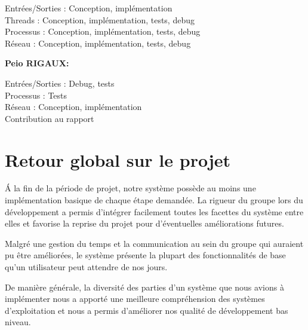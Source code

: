 \documentclass[12pt]{report}
\begin{document}
Entrées/Sorties : Conception, implémentation\\
Threads : Conception, implémentation, tests, debug\\
Processus : Conception, implémentation, tests, debug\\
Réseau : Conception, implémentation, tests, debug
\bigskip

\textbf{Peio RIGAUX:}

Entrées/Sorties : Debug, tests\\
Processus : Tests\\
Réseau : Conception, implémentation\\
Contribution au rapport




\chapter{Retour global sur le projet}

\'A la fin de la période de projet, notre système possède au moins une implémentation basique de chaque étape demandée. La rigueur du groupe lors du développement a permis d'intégrer facilement toutes les facettes du système entre elles et favorise la reprise du projet pour d'éventuelles améliorations futures.
\bigskip

Malgré une gestion du temps et la communication au sein du groupe qui auraient pu être améliorées, le système présente la plupart des fonctionnalités de base qu'un utilisateur peut attendre de nos jours.
\bigskip

De manière générale, la diversité des parties d'un système que nous avions à implémenter nous a apporté une meilleure compréhension des systèmes d'exploitation et nous a permis d'améliorer nos qualité de développement bas niveau.
\end{document}
